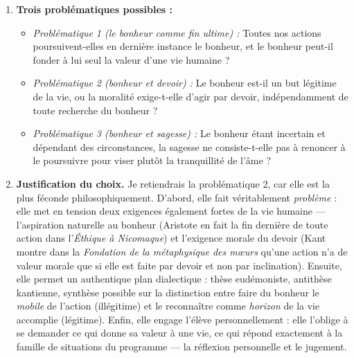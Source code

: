 \documentclass[11pt]{article}
\begin{document}
\begin{corrige}
\begin{enumerate}
\item \textbf{Trois problématiques possibles :}
\begin{itemize}
\item \emph{Problématique 1 (le bonheur comme fin ultime) :} Toutes nos actions poursuivent-elles en dernière instance le bonheur, et le bonheur peut-il fonder à lui seul la valeur d'une vie humaine ?
\item \emph{Problématique 2 (bonheur et devoir) :} Le bonheur est-il un but légitime de la vie, ou la moralité exige-t-elle d'agir par devoir, indépendamment de toute recherche du bonheur ?
\item \emph{Problématique 3 (bonheur et sagesse) :} Le bonheur étant incertain et dépendant des circonstances, la sagesse ne consiste-t-elle pas à renoncer à le poursuivre pour viser plutôt la tranquillité de l'âme ?
\end{itemize}
\item \textbf{Justification du choix.} Je retiendrais la problématique 2, car elle est la plus féconde philosophiquement. D'abord, elle fait véritablement \emph{problème} : elle met en tension deux exigences également fortes de la vie humaine --- l'aspiration naturelle au bonheur (Aristote en fait la fin dernière de toute action dans l'\emph{Éthique à Nicomaque}) et l'exigence morale du devoir (Kant montre dans la \emph{Fondation de la métaphysique des mœurs} qu'une action n'a de valeur morale que si elle est faite par devoir et non par inclination). Ensuite, elle permet un authentique plan dialectique : thèse eudémoniste, antithèse kantienne, synthèse possible sur la distinction entre faire du bonheur le \emph{mobile} de l'action (illégitime) et le reconnaître comme \emph{horizon} de la vie accomplie (légitime). Enfin, elle engage l'élève personnellement : elle l'oblige à se demander ce qui donne sa valeur à une vie, ce qui répond exactement à la famille de situations du programme --- la réflexion personnelle et le jugement.
\end{enumerate}
\end{corrige}
\end{document}
